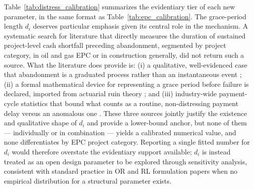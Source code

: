 Table~\ref{tab:distress_calibration} summarizes the evidentiary tier of each new parameter, in the same format as Table~\ref{tab:epc_calibration}. The grace-period length $d_i$ deserves particular emphasis given its central role in the mechanism. A systematic search for literature that directly measures the duration of sustained project-level cash shortfall preceding abandonment, segmented by project category, in oil and gas EPC or in construction generally, did not return such a source. What the literature does provide is: (i) a qualitative, well-evidenced case that abandonment is a graduated process rather than an instantaneous event \cite{macbarango2017abandonment}; (ii) a formal mathematical device for representing a grace period before failure is declared, imported from actuarial ruin theory \cite{dassioswu2008parisian}; and (iii) industry-wide payment-cycle statistics that bound what counts as a routine, non-distressing payment delay versus an anomalous one \cite{dnb2021dso,pwc2021workingcapital,munyaobamfo2011delayedpayment}. These three sources jointly justify the existence and qualitative shape of $d_i$ and provide a lower-bound anchor, but none of them — individually or in combination — yields a calibrated numerical value, and none differentiates by EPC project category. Reporting a single fitted number for $d_i$ would therefore overstate the evidentiary support available; $d_i$ is instead treated as an open design parameter to be explored through sensitivity analysis, consistent with standard practice in OR and RL formulation papers when no empirical distribution for a structural parameter exists.

